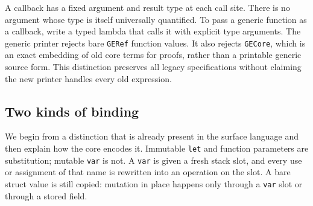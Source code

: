 \documentclass[11pt]{article}
\begin{document}
A callback has a fixed argument and result type at each call site.
There is no argument whose type is itself universally quantified.
To pass a generic function as a callback, write a typed lambda that calls
it with explicit type arguments. The generic printer rejects bare
\texttt{GERef} function values. It also rejects \texttt{GECore}, which is
an exact embedding of old core terms for proofs, rather than a printable
generic source form. This distinction preserves all legacy specifications
without claiming the new printer handles every old expression.

\subsection{Two kinds of binding}

We begin from a distinction that is already present in the surface language and then explain how the core encodes it.
Immutable \texttt{let} and function parameters are substitution; mutable \texttt{var} is not.
A \texttt{var} is given a fresh stack slot, and every use or assignment of that name is rewritten into an operation on the slot.
A bare struct value is still copied: mutation in place happens only through a \texttt{var} slot or through a stored field.
\end{document}
